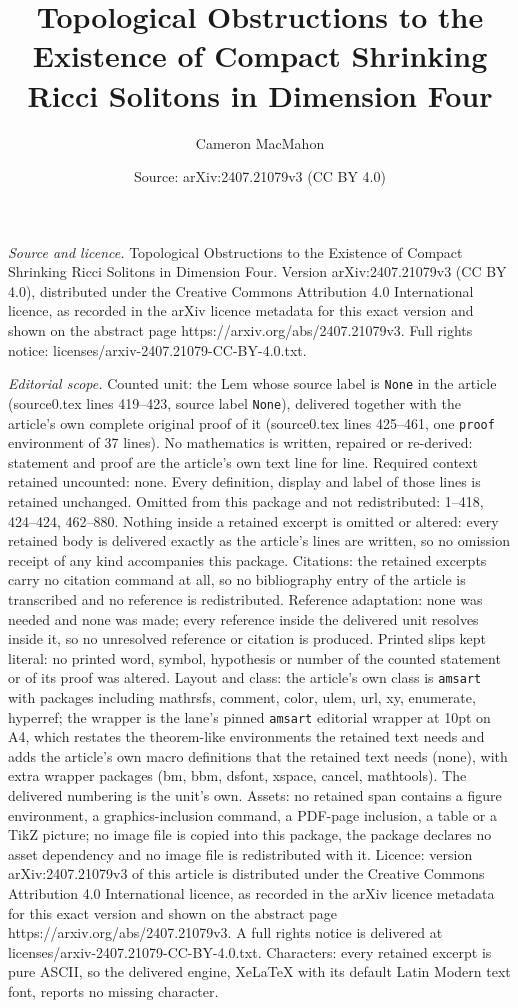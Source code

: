 \documentclass[10pt,a4paper]{amsart}
\title[Topological Obstructions to the Existence of Compact Shrinki]{Topological Obstructions to the Existence of Compact Shrinking Ricci Solitons in Dimension Four}
\author{Cameron MacMahon}
\date{Source: arXiv:2407.21079v3 (CC BY 4.0)}
\begin{document}
\maketitle

\noindent\emph{Source and licence.} Topological Obstructions to the Existence of Compact Shrinking Ricci Solitons in Dimension Four. Version arXiv:2407.21079v3 (CC BY 4.0), distributed under the Creative Commons Attribution 4.0 International licence, as recorded in the arXiv licence metadata for this exact version and shown on the abstract page https://arxiv.org/abs/2407.21079v3. Full rights notice: licenses/arxiv-2407.21079-CC-BY-4.0.txt.\par\smallskip

\noindent\textit{Editorial scope.} Counted unit: the Lem whose source label is \texttt{None} in the article (source0.tex lines 419--423, source label \texttt{None}), delivered together with the article's own complete original proof of it (source0.tex lines 425--461, one \texttt{proof} environment of 37 lines). No mathematics is written, repaired or re-derived: statement and proof are the article's own text line for line. Required context retained uncounted: none. Every definition, display and label of those lines is retained unchanged. Omitted from this package and not redistributed: 1--418, 424--424, 462--880. Nothing inside a retained excerpt is omitted or altered: every retained body is delivered exactly as the article's lines are written, so no omission receipt of any kind accompanies this package. Citations: the retained excerpts carry no citation command at all, so no bibliography entry of the article is transcribed and no reference is redistributed. Reference adaptation: none was needed and none was made; every reference inside the delivered unit resolves inside it, so no unresolved reference or citation is produced. Printed slips kept literal: no printed word, symbol, hypothesis or number of the counted statement or of its proof was altered. Layout and class: the article's own class is \texttt{amsart} with packages including mathrsfs, comment, color, ulem, url, xy, enumerate, hyperref; the wrapper is the lane's pinned \texttt{amsart} editorial wrapper at 10pt on A4, which restates the theorem-like environments the retained text needs and adds the article's own macro definitions that the retained text needs (none), with extra wrapper packages (bm, bbm, dsfont, xspace, cancel, mathtools). The delivered numbering is the unit's own. Assets: no retained span contains a figure environment, a graphics-inclusion command, a PDF-page inclusion, a table or a TikZ picture; no image file is copied into this package, the package declares no asset dependency and no image file is redistributed with it. Licence: version arXiv:2407.21079v3 of this article is distributed under the Creative Commons Attribution 4.0 International licence, as recorded in the arXiv licence metadata for this exact version and shown on the abstract page https://arxiv.org/abs/2407.21079v3. A full rights notice is delivered at licenses/arxiv-2407.21079-CC-BY-4.0.txt. Characters: every retained excerpt is pure ASCII, so the delivered engine, XeLaTeX with its default Latin Modern text font, reports no missing character.
\end{document}
